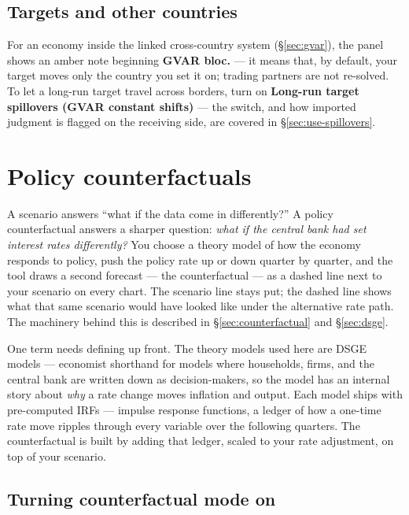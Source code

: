 \documentclass[11pt]{article}
\theoremstyle{definition}
\theoremstyle{remark}
\begin{document}
\subsection{Targets and other countries}

For an economy inside the linked cross-country system (\S\ref{sec:gvar}), the panel
shows an amber note beginning \textbf{GVAR bloc.} --- it means that, by default, your
target moves only the country you set it on; trading partners are not re-solved. To
let a long-run target travel across borders, turn on \textbf{Long-run target
spillovers (GVAR constant shifts)} --- the switch, and how imported judgment is
flagged on the receiving side, are covered in \S\ref{sec:use-spillovers}.

\section{Policy counterfactuals}\label{sec:use-counterfactual}

A scenario answers ``what if the data come in differently?'' A policy
counterfactual answers a sharper question: \emph{what if the central bank had
set interest rates differently?} You choose a theory model of how the economy
responds to policy, push the policy rate up or down quarter by quarter, and the
tool draws a second forecast --- the counterfactual --- as a dashed line next
to your scenario on every chart. The scenario line stays put; the dashed line
shows what that same scenario would have looked like under the alternative
rate path. The machinery behind this is described in \S\ref{sec:counterfactual}
and \S\ref{sec:dsge}.

One term needs defining up front. The theory models used here are DSGE models
--- economist shorthand for models where households, firms, and the central
bank are written down as decision-makers, so the model has an internal story
about \emph{why} a rate change moves inflation and output. Each model ships
with pre-computed IRFs --- impulse response functions, a ledger of how a
one-time rate move ripples through every variable over the following quarters.
The counterfactual is built by adding that ledger, scaled to your rate
adjustment, on top of your scenario.

\subsection{Turning counterfactual mode on}
\end{document}
